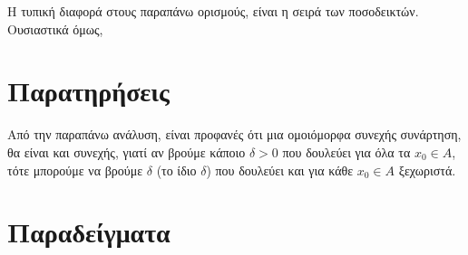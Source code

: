 Η τυπική διαφορά στους παραπάνω ορισμούς, είναι η σειρά των ποσοδεικτών. Ουσιαστικά όμως,  


\vspace{\baselineskip}

\section{Παρατηρήσεις}

Από την παραπάνω ανάλυση, είναι προφανές ότι μια ομοιόμορφα συνεχής συνάρτηση, θα είναι 
και συνεχής, γιατί αν βρούμε κάποιο $ \delta > 0 $ που δουλεύει για όλα τα $ x_{0} \in A
$, τότε μπορούμε να βρούμε $ \delta $ (το ίδιο $\delta$) που δουλεύει και για κάθε 
$ x_{0} \in A $ ξεχωριστά.

\vspace{\baselineskip}

\section{Παραδείγματα}

